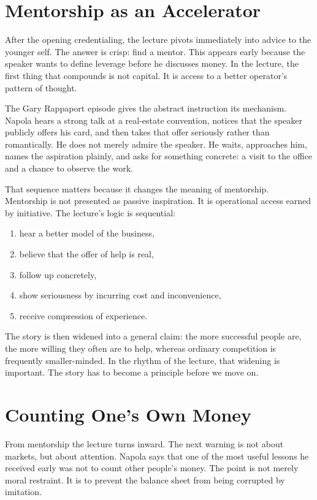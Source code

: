 \section{Mentorship as an Accelerator}

After the opening credentialing, the lecture pivots immediately into advice to the younger self. The answer is crisp: find a mentor. This appears early because the speaker wants to define leverage before he discusses money. In the lecture, the first thing that compounds is not capital. It is access to a better operator's pattern of thought.

The Gary Rappaport episode gives the abstract instruction its mechanism. Napola hears a strong talk at a real-estate convention, notices that the speaker publicly offers his card, and then takes that offer seriously rather than romantically. He does not merely admire the speaker. He waits, approaches him, names the aspiration plainly, and asks for something concrete: a visit to the office and a chance to observe the work.

That sequence matters because it changes the meaning of mentorship. Mentorship is not presented as passive inspiration. It is operational access earned by initiative. The lecture's logic is sequential:
\begin{enumerate}
\item hear a better model of the business,
\item believe that the offer of help is real,
\item follow up concretely,
\item show seriousness by incurring cost and inconvenience,
\item receive compression of experience.
\end{enumerate}
The story is then widened into a general claim: the more successful people are, the more willing they often are to help, whereas ordinary competition is frequently smaller-minded. In the rhythm of the lecture, that widening is important. The story has to become a principle before we move on.

\section{Counting One's Own Money}

From mentorship the lecture turns inward. The next warning is not about markets, but about attention. Napola says that one of the most useful lessons he received early was not to count other people's money. The point is not merely moral restraint. It is to prevent the balance sheet from being corrupted by imitation.

